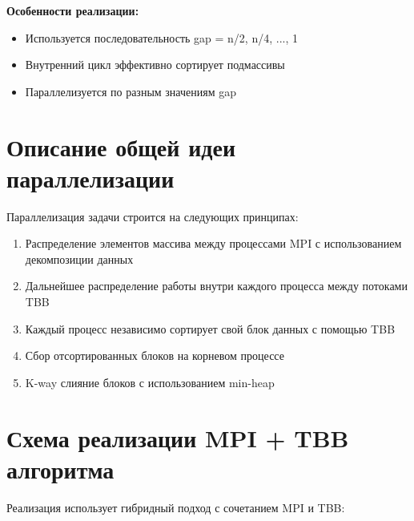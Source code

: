 \documentclass[a4paper,12pt]{article}
\begin{document}
\textbf{Особенности реализации:}
\begin{itemize}
    \item Используется последовательность gap = n/2, n/4, ..., 1
    \item Внутренний цикл эффективно сортирует подмассивы
    \item Параллелизуется по разным значениям gap
\end{itemize}

\section*{Описание общей идеи параллелизации}
Параллелизация задачи строится на следующих принципах:
\begin{enumerate}
    \item Распределение элементов массива между процессами MPI с использованием декомпозиции данных
    \item Дальнейшее распределение работы внутри каждого процесса между потоками TBB
    \item Каждый процесс независимо сортирует свой блок данных с помощью TBB
    \item Сбор отсортированных блоков на корневом процессе
    \item K-way слияние блоков с использованием min-heap
\end{enumerate}

\section*{Схема реализации MPI + TBB алгоритма}
Реализация использует гибридный подход с сочетанием MPI и TBB:
\end{document}
